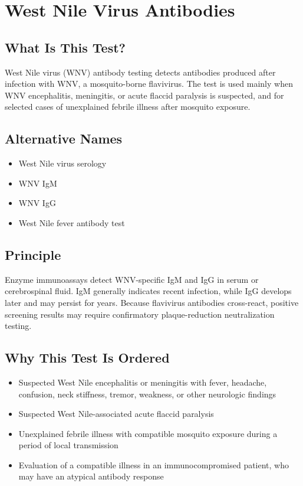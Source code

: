 \chapter{West Nile Virus Antibodies}

\section*{What Is This Test?}
West Nile virus (WNV) antibody testing detects antibodies produced after infection with WNV, a mosquito-borne flavivirus. The test is used mainly when WNV encephalitis, meningitis, or acute flaccid paralysis is suspected, and for selected cases of unexplained febrile illness after mosquito exposure.

\section*{Alternative Names}
\begin{itemize}
  \item West Nile virus serology
  \item WNV IgM
  \item WNV IgG
  \item West Nile fever antibody test
\end{itemize}
\section*{Principle}
Enzyme immunoassays detect WNV-specific IgM and IgG in serum or cerebrospinal fluid. IgM generally indicates recent infection, while IgG develops later and may persist for years. Because flavivirus antibodies cross-react, positive screening results may require confirmatory plaque-reduction neutralization testing.

\section*{Why This Test Is Ordered}
\begin{itemize}
  \item Suspected West Nile encephalitis or meningitis with fever, headache, confusion, neck stiffness, tremor, weakness, or other neurologic findings
  \item Suspected West Nile-associated acute flaccid paralysis
  \item Unexplained febrile illness with compatible mosquito exposure during a period of local transmission
  \item Evaluation of a compatible illness in an immunocompromised patient, who may have an atypical antibody response
\end{itemize}

